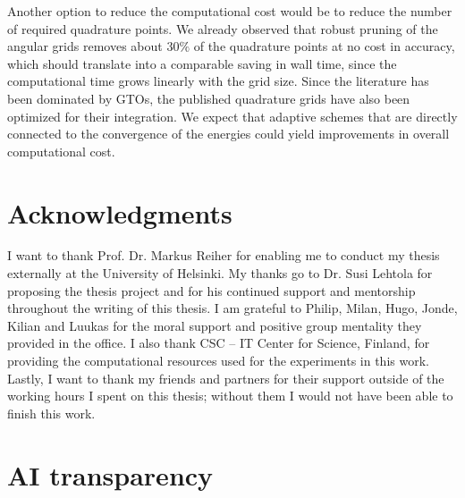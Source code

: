 \documentclass{article}
\begin{document}
Another option to reduce the computational cost would be to reduce
the number of required quadrature points. We already observed that
robust pruning of the angular grids removes about \( 30\% \) of the
quadrature points at no cost in accuracy, which should translate into
a comparable saving in wall time, since the computational time grows
linearly with the grid size. Since the literature has been dominated
by GTOs, the published quadrature grids have also been optimized for
their integration. We expect that adaptive schemes that are
directly connected
to the convergence of the energies could yield improvements in
overall computational cost.

\section*{Acknowledgments}\label{sec:acknowledgments}

I want to thank Prof. Dr. Markus Reiher for enabling me to conduct my
thesis externally at the University of Helsinki. My thanks go to
Dr. Susi Lehtola for proposing the thesis project and for his
continued support and mentorship
throughout the writing of this thesis. I am grateful to Philip, Milan,
Hugo, Jonde, Kilian and Luukas for the moral support and positive
group mentality they provided in the office.
I also thank CSC -- IT Center for Science, Finland, for providing the
computational resources used for the experiments in this work.
Lastly, I want to thank my friends and partners for their support
outside of the working hours I spent on this thesis; without them I
would not have been able to finish this work.

\section*{AI transparency}\label{sec:AI transparency}
\end{document}

